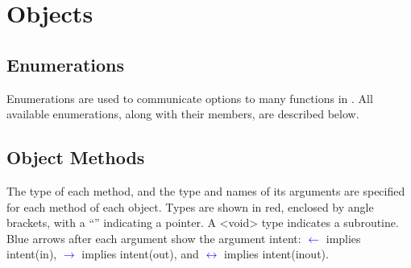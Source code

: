 \section{Objects}

\subsection{Enumerations}

Enumerations are used to communicate options to many functions in \glc. All available enumerations, along with their members, are described below.





\subsection{Object Methods}

The type of each method, and the type and names of its arguments are specified for each method of each object. Types are shown in red, enclosed by angle brackets, with a ``{\normalfont \ttfamily *}'' indicating a pointer. A {\normalfont \ttfamily \textless void\textgreater} type indicates a subroutine. Blue arrows after each argument show the argument intent: \textcolor{blue}{$\leftarrow$} implies {\normalfont \ttfamily intent(in)},  \textcolor{blue}{$\rightarrow$} implies {\normalfont \ttfamily intent(out)}, and \textcolor{blue}{$\leftrightarrow$} implies {\normalfont \ttfamily intent(inout)}.



